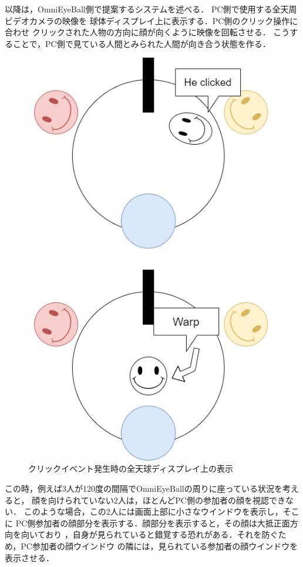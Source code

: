 以降は，OmniEyeBall側で提案するシステムを述べる．
PC側で使用する全天周ビデオカメラの映像を
球体ディスプレイ上に表示する．PC側のクリック操作に合わせ
クリックされた人物の方向に顔が向くように映像を回転させる．
こうすることで，PC側で見ている人間とみられた人間が向き合う状態を作る．

\begin{figure}[tbp]
  \centering
  \includegraphics[scale=0.6]{fig/OEBsideSlideimg.png}
  \caption{クリックイベント発生時の全天球ディスプレイ上の表示}\label{OEBGUI1}
\end{figure}

この時，例えば3人が120度の間隔でOmniEyeBallの周りに座っている状況を考えると，
顔を向けられていない2人は，ほとんどPC側の参加者の顔を視認できない．
このような場合，この2人には画面上部に小さなウインドウを表示し，そこに
PC側参加者の顔部分を表示する．顔部分を表示すると，その顔は大抵正面方向を向いており
，自身が見られていると錯覚する恐れがある．それを防ぐため，PC参加者の顔ウインドウ
の隣には，見られている参加者の顔ウインドウを表示させる．

